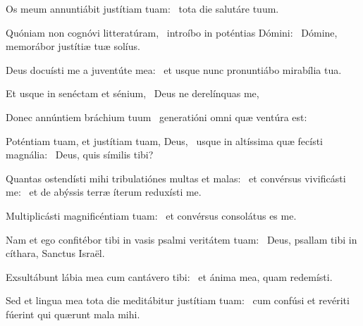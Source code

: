 \item Os meum annuntiábit justítiam tuam:~\psstar{} tota die salutáre tuum.

\item Quóniam non cognóvi litteratúram,~\pscross{} introíbo in poténtias Dómini:~\psstar{} Dómine, memorábor justítiæ tuæ solíus.

\item Deus docuísti me a juventúte mea:~\psstar{} et usque nunc pronuntiábo mirabília tua.

\item Et usque in senéctam et sénium,~\psstar{} Deus ne derelínquas me,

\item Donec annúntiem bráchium tuum~\psstar{} generatióni omni quæ ventúra est:

\item Poténtiam tuam, et justítiam tuam, Deus,~\pscross{} usque in altíssima quæ fecísti magnália:~\psstar{} Deus, quis símilis tibi?

\item Quantas ostendísti mihi tribulatiónes multas et malas:~\pscross{} et convérsus vivificásti me:~\psstar{} et de abýssis terræ íterum reduxísti me.

\item Multiplicásti magnificéntiam tuam:~\psstar{} et convérsus consolátus es me.

\item Nam et ego confitébor tibi in vasis psalmi veritátem tuam:~\psstar{} Deus, psallam tibi in cíthara, Sanctus Israël.

\item Exsultábunt lábia mea cum cantávero tibi:~\psstar{} et ánima mea, quam redemísti.

\item Sed et lingua mea tota die meditábitur justítiam tuam:~\psstar{} cum confúsi et revériti fúerint qui quærunt mala mihi.

